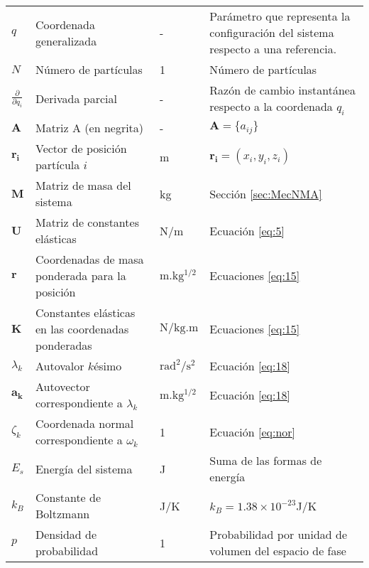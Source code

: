 \begin{longtable}{p{2cm}p{4cm}p{2cm}p{8cm}}
$q$&Coordenada generalizada&\hspace{6pt}-&Par\'{a}metro que representa la configuraci\'{o}n del sistema respecto a una referencia.\\%
$N$&N\'{u}mero de part\'{i}culas&\hspace{6pt}1&N\'{u}mero de part\'{i}culas\\%
$\frac{\partial}{\partial q_i}$&Derivada parcial&\hspace{6pt}-&Raz\'{o}n de cambio instant\'{a}nea respecto a la coordenada $q_i$\\%
$\mathbf{A}$&Matriz A (en negrita)&\hspace{6pt}-&$\mathbf{A}=\{a_{ij}\}$\\%
$\mathbf{r_i}$&Vector de posici\'{o}n part\'{i}cula $i$&\hspace{6pt}m&$\mathbf{r_i}=\left(x_i,y_i,z_i\right)$\\%
$\mathbf{M}$&Matriz de masa del sistema&\hspace{6pt}kg&Secci\'{o}n \ref{sec:MecNMA}\\%
$\mathbf{U}$&Matriz de constantes el\'{a}sticas&\hspace{6pt}N/m&Ecuaci\'{o}n \eqref{eq:5}\\%
$\mathbf{r}$&Coordenadas de masa ponderada para la posici\'{o}n&\hspace{6pt}$\mathrm{m.kg^{1/2}}$ &Ecuaciones \eqref{eq:15}\\%
$\mathbf{K}$&Constantes el\'{a}sticas en las coordenadas ponderadas&\hspace{6pt}$\mathrm{N/kg.m}$ &Ecuaciones \eqref{eq:15}\\%
$\lambda_k$&Autovalor $k$\'{e}simo &\hspace{6pt}$\mathrm{rad^2/s^2}$&Ecuaci\'{o}n \eqref{eq:18}\\%
$\mathbf{a_k}$&Autovector correspondiente a $\lambda_k$&\hspace{6pt}$\mathrm{m.kg^{1/2}}$ &Ecuaci\'{o}n \eqref{eq:18}\\%
$\zeta_k$   &Coordenada normal correspondiente a $\omega_k$&\hspace{6pt}1 &Ecuaci\'{o}n \eqref{eq:nor}\\%
$E_s$&Energ\'{i}a del sistema &\hspace{6pt}J  &Suma de las formas de energ\'{i}a\\%
$k_B$&Constante de Boltzmann &\hspace{6pt}J/K&$k_B=1.38\times 10^{-23}$J/K\\%
$p$&Densidad de probabilidad &\hspace{6pt}1 &Probabilidad por unidad de volumen del espacio de fase\\%

\end{longtable}
